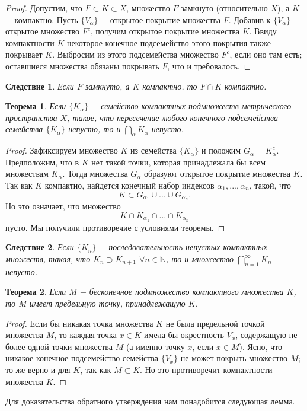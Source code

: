 \documentclass{article}
\newtheorem{theorem}{Теорема}[section]
\newtheorem*{consequence}{Следствие}
\begin{document}
\begin{proof}
Допустим, что \(F \subset K \subset X\), множество \(F\) замкнуто (относительно \(X\)), а \(K\) \(-\) компактно. Пусть \(\{V_\alpha\}\) \(-\) открытое покрытие множества \(F\). Добавив к \(\{V_\alpha\}\) открытое множество \(F^c\), получим открытое покрытие множества \(K\). Ввиду компактности \(K\) некоторое конечное подсемейство этого покрытия также покрывает \(K\). Выбросим из этого подсемейства множество \(F^c\), если оно там есть; оставшиеся множества обязаны покрывать \(F\), что и требовалось.
\end{proof}

\begin{consequence}
Если \(F\) замкнуто, а \(K\) компактно, то \(F \cap K\) компактно.
\end{consequence}

\begin{theorem}
Если \(\{K_\alpha\}\) \(-\) семейство компактных подмножеств метрического пространства \(X\), такое, что пересечение любого конечного подсемейства семейства \(\{K_\alpha\}\) непусто, то и \(\bigcap\limits_{\alpha}K_\alpha\) непусто.
\end{theorem}

\begin{proof}
Зафиксируем множество \(K\) из семейства \(\{K_\alpha\}\) и положим \(G_\alpha = K^c_{\alpha}\). Предположим, что в \(K\) нет такой точки, которая принадлежала бы всем множествам \(K_\alpha\). Тогда множества \(G_\alpha\) образуют открытое покрытие множества \(K\). Так как \(K\) компактно, найдется конечный набор индексов \(\alpha_1, ..., \alpha_n\), такой, что
\[
K \subset G_{\alpha_1} \cup ... \cup G_{\alpha_n}.
\]
Но это означает, что множество
\[
K \cap K_{\alpha_1} \cap ... \cap K_{\alpha_n}
\]
пусто. Мы получили противоречие с условиями теоремы.
\end{proof}

\begin{consequence}
Если \(\{K_n\}\) \(-\) последовательность непустых компактных множеств, такая, что \(K_n \supset K_{n + 1}\) \(\forall n \in \mathbb{N}\), то и множество \(\bigcap\limits_{n=1}^{\infty}K_n\) непусто.
\end{consequence}

\begin{theorem}
Если \(M\) \(-\) бесконечное подмножество компактного множества \(K\), то \(M\) имеет предельную точку, принадлежащую \(K\).
\end{theorem}

\begin{proof}
Если бы никакая точка множества \(K\) не была предельной точкой множества \(M\), то каждая точка \(x \in K\) имела бы окрестность \(V_x\), содержащую не более одной точки множества \(M\) (а именно точку \(x\), если \(x \in M\)). Ясно, что никакое конечное подсемейство семейства \(\{V_x\}\) не может покрыть множество \(M\); то же верно и для \(K\), так как \(M \subset K\). Но это противоречит компактности множества \(K\).
\end{proof}

Для доказательства обратного утверждения нам понадобится следующая лемма.
\end{document}
